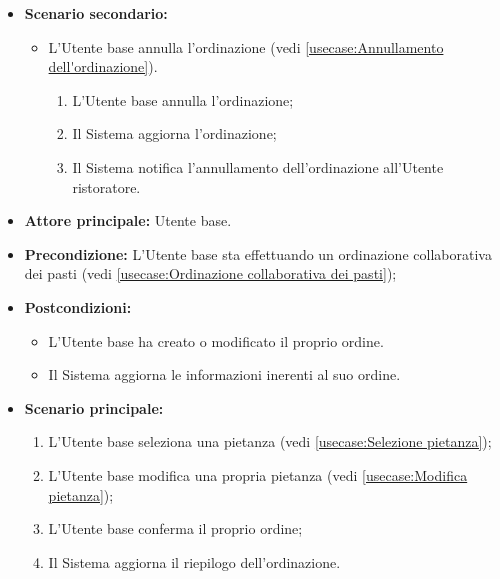 \begin{itemize}
	\item \textbf{Scenario secondario:}
	      \begin{itemize}
		      \item L'Utente base annulla l'ordinazione (vedi
		            \autoref{usecase:Annullamento dell'ordinazione}).
		            \begin{enumerate}
			            \item L'Utente base annulla l'ordinazione;
			            \item Il Sistema aggiorna l'ordinazione;
			            \item Il Sistema notifica l'annullamento dell'ordinazione
			                  all'Utente ristoratore.
		            \end{enumerate}
	      \end{itemize}
\end{itemize}


\label{usecase:Creazione e modifica del proprio ordine}
\begin{itemize}
	\item \textbf{Attore principale:} Utente base.

	\item \textbf{Precondizione:} L'Utente base sta effettuando un ordinazione collaborativa dei pasti (vedi \autoref{usecase:Ordinazione collaborativa dei pasti});

	\item \textbf{Postcondizioni:}
		\begin{itemize}
			\item L'Utente base ha creato o modificato il proprio ordine.
			\item Il Sistema aggiorna le informazioni inerenti al suo ordine.
		\end{itemize}

	\item \textbf{Scenario principale:}
	      \begin{enumerate}
		      \item L'Utente base seleziona una pietanza (vedi \autoref{usecase:Selezione pietanza});
		      \item L'Utente base modifica una propria pietanza (vedi \autoref{usecase:Modifica pietanza});
		      \item L'Utente base conferma il proprio ordine;
		      \item Il Sistema aggiorna il riepilogo dell'ordinazione.
	      \end{enumerate}
\end{itemize}


